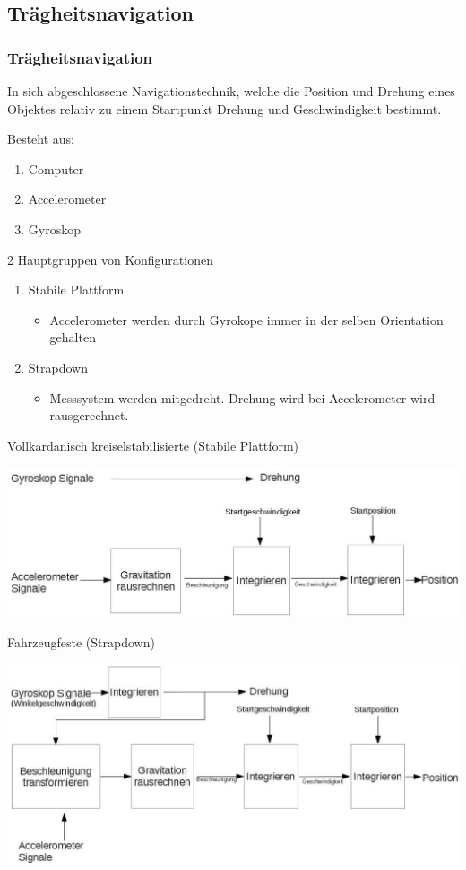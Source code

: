 \documentclass[10pt,a4paper,oneside]{beamer}
\begin{document}
\begin{frame}
	\section{Trägheitsnavigation}
	\frametitle{Trägheitsnavigation}
	In sich abgeschlossene Navigationstechnik, 
	welche die Position und Drehung eines Objektes relativ zu einem Startpunkt Drehung und Geschwindigkeit bestimmt.
	
	Besteht aus:
	\begin{enumerate}
		\item Computer
		\item Accelerometer
		\item Gyroskop
	\end{enumerate}
	
	2 Hauptgruppen von Konfigurationen \cite{Wood07}
	\begin{enumerate}
		\item Stabile Plattform
			\begin{itemize}
				\item Accelerometer werden durch Gyrokope immer in der selben Orientation gehalten
			\end{itemize}
		\item Strapdown
			\begin{itemize}
				\item Messsystem werden mitgedreht. Drehung wird bei Accelerometer wird rausgerechnet.
			\end{itemize}
	\end{enumerate}
\end{frame}



\begin{frame}
	Vollkardanisch kreiselstabilisierte (Stabile Plattform)

	\includegraphics[width=\textwidth, height=0.4\textheight,keepaspectratio=true]{images/stable.jpg} 

	\bigskip
	Fahrzeugfeste (Strapdown)

		\includegraphics[width=\textwidth, height=0.4\textheight,keepaspectratio=true]{images/strap.jpg} 


\end{frame}
\end{document}
